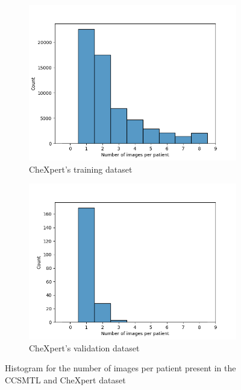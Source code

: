 \documentclass[11pt]{article}
\begin{document}
\begin{figure}[H]
     \begin{subfigure}[b]{0.45\linewidth}
         \centering
         \includegraphics[width=\linewidth]{plots/image_count_chexpert_train}
         \caption{CheXpert's training dataset}
         \vspace{4ex}
         \label{fig:count_image_chexpert_train}
     \end{subfigure}
     \hfill
     \begin{subfigure}[b]{0.45\linewidth}
         \centering
         \includegraphics[width=\linewidth]{plots/image_count_chexpert_valid}
         \caption{CheXpert's validation dataset}
         \vspace{4ex}
         \label{fig:count_image_chexpert_valid}
     \end{subfigure}

     \caption{Histogram for the number of images per patient present in the CCSMTL and CheXpert dataset}

\end{figure}
\end{document}
